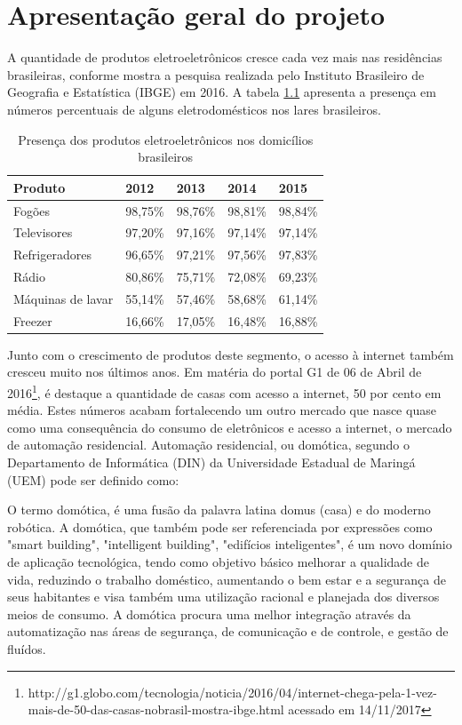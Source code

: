\chapter{Apresentação geral do projeto}

A quantidade de produtos eletroeletrônicos cresce cada vez mais nas residências brasileiras, conforme mostra a pesquisa realizada pelo Instituto Brasileiro de Geografia e Estatística (IBGE) em 2016. A tabela \ref{ibge} apresenta a presença em números percentuais de alguns eletrodomésticos nos lares brasileiros.

\begin{table}[H]
   \caption{Presença dos produtos eletroeletrônicos nos domicílios brasileiros}
   \label{ibge}
{
   \begin{tabular}{lllll}
   \toprule
   Produto & 2012 & 2013 & 2014 & 2015 \\
   \midrule \midrule
   
    Fogões & 98,75\% & 98,76\% & 98,81\% & 98,84\% \\
    Televisores & 97,20\% & 97,16\% & 97,14\% & 97,14\% \\
    Refrigeradores & 96,65\% & 97,21\% & 97,56\% & 97,83\% \\
    Rádio & 80,86\% & 75,71\% & 72,08\% & 69,23\% \\
    Máquinas de lavar & 55,14\% & 57,46\% & 58,68\% & 61,14\% \\
    Freezer & 16,66\% & 17,05\% & 16,48\% & 16,88\% \\
   
   \bottomrule
   \end{tabular}
}{
}
\end{table}

Junto com o crescimento de produtos deste segmento, o acesso à internet também cresceu muito nos últimos anos. Em matéria do portal G1 de 06 de Abril de 2016\footnote{http://g1.globo.com/tecnologia/noticia/2016/04/internet-chega-pela-1-vez-mais-de-50-das-casas-nobrasil-mostra-ibge.html acessado em 14/11/2017}, é destaque a quantidade de casas com acesso a internet, 50 por cento em média. Estes números acabam fortalecendo um outro mercado que nasce quase como uma consequência do consumo de eletrônicos e acesso a internet, o mercado de automação residencial.
Automação residencial, ou domótica, segundo o Departamento de Informática (DIN) da Universidade Estadual de Maringá (UEM) pode ser definido como:
\begin{citacao}
O termo domótica, é uma fusão da palavra latina domus (casa) e do moderno robótica. A domótica, que também pode ser referenciada por expressões como "smart building", "intelligent building", "edifícios inteligentes", é um novo domínio de aplicação tecnológica, tendo como objetivo básico melhorar a qualidade de vida, reduzindo o trabalho doméstico, aumentando o bem estar e a segurança de seus habitantes e visa também uma utilização racional e planejada dos diversos meios de consumo. A domótica procura uma melhor integração através da automatização nas áreas de segurança, de comunicação e de controle, e gestão de fluídos. \cite{DOMOTICA}
\end{citacao}

